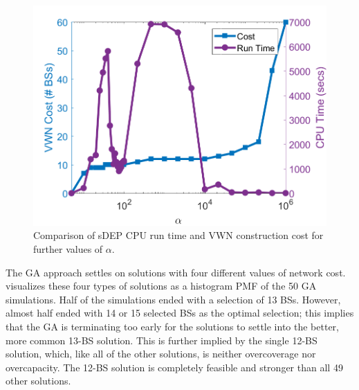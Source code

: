 \documentclass[12pt,dvipsnames]{report}
\begin{document}
\begin{figure}[ht]
	\centering
	\includegraphics[height=0.45\textheight]{Figures/Prelim_O25sDEPComparisonCostRunTimeExpandedAlpha}
	\caption[Expanded preliminary simulation comparison of sDEP run time and cost]{Comparison of sDEP CPU run time and VWN construction cost for further values of $\alpha$.}
	\label{fig:Prelim_sDEPCompCostRunTimeExpanded}
\end{figure}

The GA approach settles on solutions with four different values of network cost.   visualizes these four types of solutions as a histogram PMF of the 50 GA simulations.  Half of the simulations ended with a selection of 13 BSs.  However, almost half ended with 14 or 15 selected BSs as the optimal selection; this implies that the GA is terminating too early for the solutions to settle into the better, more common 13-BS solution.  This is further implied by the single 12-BS solution, which, like all of the other solutions, is neither overcoverage nor overcapacity.  The 12-BS solution is completely feasible and stronger than all 49 other solutions.
\end{document}
